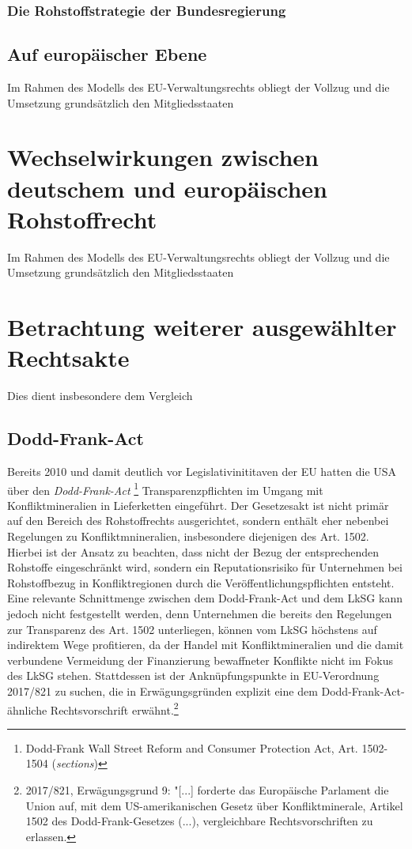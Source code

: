 \documentclass[12pt,a4paper,oneside]{book} %
\begin{document}
	\subsubsection{Die Rohstoffstrategie der Bundesregierung}
	
	\subsection{Auf europäischer Ebene}
	
	Im Rahmen des Modells des EU-Verwaltungsrechts obliegt der Vollzug und die Umsetzung grundsätzlich den Mitgliedsstaaten
	
	\section{Wechselwirkungen zwischen deutschem und europäischen Rohstoffrecht}
		Im Rahmen des Modells des EU-Verwaltungsrechts obliegt der Vollzug und die Umsetzung grundsätzlich den Mitgliedsstaaten
		
	\section{Betrachtung weiterer ausgewählter Rechtsakte}
		
	Dies dient insbesondere dem Vergleich 
		
	\subsection{Dodd-Frank-Act}
	Bereits 2010 und damit deutlich vor Legislativinititaven der EU hatten die USA über den \textit{Dodd-Frank-Act} \footnote{Dodd-Frank Wall Street Reform and Consumer Protection Act, Art. 1502-1504 (\textit{sections})} Transparenzpflichten im Umgang mit Konfliktmineralien in Lieferketten eingeführt. Der Gesetzesakt ist nicht primär auf den Bereich des Rohstoffrechts ausgerichtet, sondern enthält eher nebenbei Regelungen zu Konfliktmnineralien, insbesondere diejenigen des Art. 1502.  Hierbei ist der Ansatz zu beachten, dass nicht der Bezug der entsprechenden Rohstoffe eingeschränkt wird, sondern ein Reputationsrisiko für Unternehmen bei Rohstoffbezug in Konfliktregionen durch die Veröffentlichungspflichten entsteht.\autocite[Rn. 415]{ruttloff_lieferkettensorgfaltspflichtengesetz_2022} Eine relevante Schnittmenge zwischen dem Dodd-Frank-Act und dem LkSG kann jedoch nicht festgestellt werden, denn Unternehmen die bereits den Regelungen zur Transparenz des Art. 1502 unterliegen, können vom LkSG höchstens auf indirektem Wege profitieren, da der Handel mit Konfliktmineralien und die damit verbundene Vermeidung der Finanzierung bewaffneter Konflikte nicht im Fokus des LkSG stehen.\autocite[Rn 423]{ruttloff_lieferkettensorgfaltspflichtengesetz_2022} Stattdessen ist der Anknüpfungspunkte in EU-Verordnung 2017/821 zu suchen, die in Erwägungsgründen explizit eine dem Dodd-Frank-Act-ähnliche Rechtsvorschrift erwähnt.\footnote{2017/821, Erwägungsgrund 9: "[...] forderte das Europäische Parlament die Union auf, mit dem US-amerikanischen Gesetz über Konfliktminerale, Artikel 1502 des Dodd-Frank-Gesetzes (...), vergleichbare Rechtsvorschriften zu erlassen.} 
		
\end{document}
